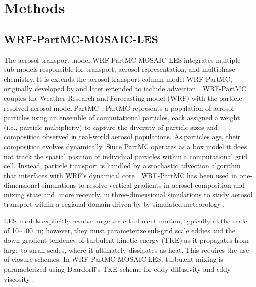 \documentclass[journal abbreviation, manuscript]{copernicus}
\begin{document}
\section{Methods}\label{methods}

\subsection{WRF-PartMC-MOSAIC-LES}

The aerosol-transport model WRF-PartMC-MOSAIC-LES integrates multiple
sub-models responsible for transport, aerosol representation, and
multiphase chemistry. It is extends the aerosol-transport column model
WRF-PartMC, originally developed by \citet{curtis_single-column_2017}
and later extended to include advection
\citep{gmd-17-8399-2024}. WRF-PartMC couples the Weather Research and
Forecasting model (WRF) \citep{skamarock_description_2008} with the
particle-resolved aerosol model PartMC
\citep{riemer_simulating_2009}. PartMC represents a population of
aerosol particles using an ensemble of computational particles, each
assigned a weight (i.e., particle multiplicity) to capture the
diversity of particle sizes and composition observed in real-world
aerosol populations. As particles age, their composition evolves
dynamically. Since PartMC operates as a box model it does not track
the spatial position of individual particles within a computational
grid cell. Instead, particle transport is handled by a stochastic
advection algorithm that interfaces with WRF's dynamical core
\citep{gmd-17-8399-2024}. WRF-PartMC has been used in one-dimensional
simulations to resolve vertical gradients in aerosol composition and
mixing state \citep {curtis_single-column_2017} and, more recently, in
three-dimensional simulations to study aerosol transport within a
regional domain driven by by simulated meteorology
\citep{gmd-17-8399-2024}.

LES models explicitly resolve large-scale turbulent motion, typically
at the scale of 10--100~m; however, they must parameterize sub-grid
scale eddies and the down-gradient tendency of turbulent kinetic
energy (TKE) as it propagates from large to small scales, where it
ultimately dissipates as heat. This requires the use of closure
schemes. In WRF-PartMC-MOSAIC-LES, turbulent mixing is parameterized
using Deardorff's TKE scheme for eddy diffusivity and eddy viscosity
\citep{deardorff_stratocumulus-capped_1980}.
\end{document}
